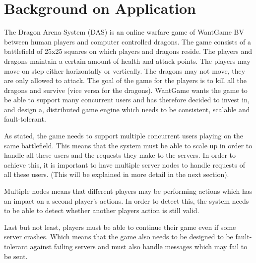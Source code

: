 \section{Background on Application }


The Dragon Arena System (DAS) is an online warfare game of WantGame BV between human players and computer controlled dragons.
The game consists of a battlefield of 25x25 squares on which players and dragons reside.
The players and dragons maintain a certain amount of health and attack points.
The players may move on step either horizontally or vertically. 
The dragons may not move, they are only allowed to attack.
The goal of the game for the players is to kill all the dragons and survive (vice versa for the dragons).
WantGame wants the game to be able to support many concurrent users and has therefore decided to invest in, and design a, distributed game engine which needs to be consistent, scalable and fault-tolerant. 

As stated, the game needs to support multiple concurrent users playing on the same battlefield. 
This means that the system must be able to scale up in order to handle all these users and the requests they make to the servers. 
In order to achieve this, it is important to have multiple server nodes to handle requests of all these users. 
(This will be explained in more detail in the next section).

Multiple nodes means that different players may be performing actions which has an impact on a second player's actions.
In order to detect this, the system needs to be able to detect whether another players action is still valid. 

Last but not least, players must be able to continue their game even if some server crashes. 
Which means that the game also needs to be designed to be fault-tolerant against failing servers and must also handle messages which may fail to be sent.
